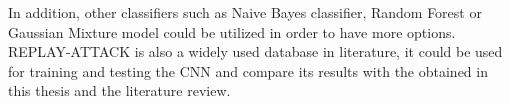 In addition, other classifiers such as Naive Bayes classifier, Random Forest or Gaussian Mixture model could be utilized in order to have more options.\\

REPLAY-ATTACK is also a widely used database in literature, it could be used for training and testing the CNN and compare its results with the obtained in this thesis and the literature review.